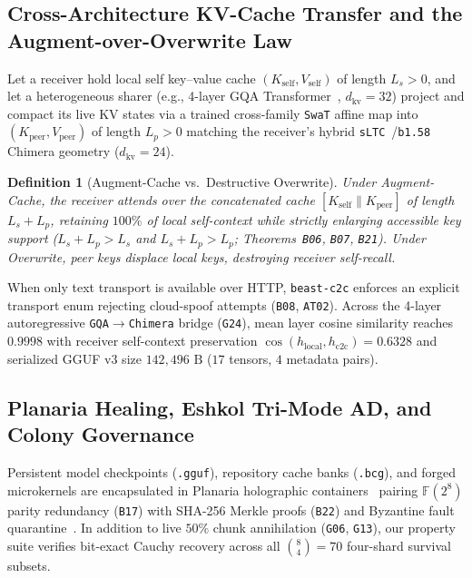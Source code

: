 \documentclass[11pt,letterpaper]{amsart}
\newtheorem{definition}[theorem]{Definition}
\newcommand{\code}[1]{{\small\texttt{#1}}}
\newcommand{\GF}{\mathbb{F}}
\begin{document}
\subsection{Cross-Architecture KV-Cache Transfer and the Augment-over-Overwrite Law}
Let a receiver hold local self key--value cache $(K_{\mathrm{self}}, V_{\mathrm{self}})$
of length $L_s > 0$, and let a heterogeneous sharer (e.g., 4-layer GQA
Transformer~\cite{ainslie2023gqa,su2024roformer}, $d_{\mathrm{kv}}=32$) project
and compact its live KV states via a trained cross-family \code{SwaT} affine map
into $(K_{\mathrm{peer}}, V_{\mathrm{peer}})$ of length $L_p > 0$ matching the
receiver's hybrid \code{sLTC}~\cite{hasani2021liquid}/\code{b1.58} Chimera
geometry ($d_{\mathrm{kv}}=24$).

\begin{definition}[Augment-Cache vs.\ Destructive Overwrite]
Under \emph{Augment-Cache}, the receiver attends over the concatenated cache
$[K_{\mathrm{self}} \mathbin{\|} K_{\mathrm{peer}}]$ of length $L_s + L_p$,
retaining $100\%$ of local self-context while strictly enlarging accessible key
support ($L_s + L_p > L_s$ and $L_s + L_p > L_p$; Theorems~\code{B06}, \code{B07},
\code{B21}). Under \emph{Overwrite}, peer keys displace local keys, destroying
receiver self-recall.
\end{definition}

When only text transport is available over HTTP, \code{beast-c2c} enforces an
explicit transport enum rejecting cloud-spoof attempts (\code{B08}, \code{AT02}).
Across the 4-layer autoregressive \code{GQA}$\to$\code{Chimera} bridge (\code{G24}),
mean layer cosine similarity reaches $0.9998$ with receiver self-context
preservation $\cos(h_{\mathrm{local}}, h_{\mathrm{c2c}}) = 0.6328$ and serialized
GGUF v3 size $142{,}496\text{ B}$ ($17$ tensors, $4$ metadata pairs).

\subsection{Planaria Healing, Eshkol Tri-Mode AD, and Colony Governance}
Persistent model checkpoints (\code{.gguf}), repository cache banks (\code{.bcg}),
and forged microkernels are encapsulated in Planaria holographic
containers~\cite{reed1960polynomial,plank1997tutorial,merkle1988digital} pairing
$\GF(2^8)$ parity redundancy (\code{B17}) with SHA-256 Merkle proofs (\code{B22})
and Byzantine fault quarantine~\cite{lamport1982byzantine}. In addition to live
$50\%$ chunk annihilation (\code{G06}, \code{G13}), our property suite verifies
bit-exact Cauchy recovery across all $\binom{8}{4} = 70$ four-shard survival
subsets.
\end{document}
